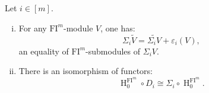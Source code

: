 \documentclass{amsart}
\numberwithin{equation}{section}
\DeclareMathOperator{\HH}{H}
\newcommand{\FI}{{\mathrm{FI}}}
\begin{document}
\subsection{}

\begin{lemma} \label{church_lemma}
   Let $i\in [m]$.
\begin{enumerate}[(i)]
\item 
For any $\FI^m$-module $V$, one has: 
\[\Sigma_i \widetilde{V} = \widetilde{\Sigma_i V} + \varepsilon_i (V),\]
an equality of $\FI^m$-submodules of $\Sigma_i V$.

\item
There is an isomorphism of functors:
\[ \HH^{\FI^m}_0 \circ D_i \cong \Sigma_i \circ \HH^{\FI^m}_0. \]
\end{enumerate}
\end{lemma}
\end{document}

